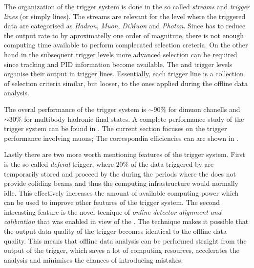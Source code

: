 The organization of the trigger system is done in the so called {\it streams} and {\it trigger lines} (or simply lines).
The streams are relevant for the \lzero level where the triggered data are categorised as {\it Hadron}, {\it Muon},
{\it DiMuon} and {\it Photon}. Since \lzero has to reduce the output rate to \hltone by aproximatelly one order of
magnitute, there is not enough computing time available to perform complecated selection creteria. On the other
hand in the subsequent trigger levels more advanced selection can be required since tracking and PID information
become available. The \hltone and \hlttwo trigger levels organise their output in trigger lines. Essentially,
each trigger line is a collection of selection criteria similar, but looser, to the ones applied during the
offline data analysis.

The overal performance of the \lhcb trigger system is $\sim 90\%$ for dimuon chanells and $\sim 30\%$ for
multibody hadronic final states. A complete performance study of the trigger system can be found in \cite{}.
The current section focuses on the trigger performance involving muons; The correspondin efficiencies can
are shown in \figref{}.

Lastly there are two more worth mentioning features of the \lhcb trigger system. First is the so called
{\it deferal} trigger, where $20\%$ of the data triggered by \lzero are temporarily stored and procced by the \hltone
during the periods where the \lhc does not provide coliding beams and thus the \lhcb computing infrastructure
would normally idle. This effectively increases the amount of available computing power which can be used
to improve other feutures of the trigger system. The second intreasting feature is the novel tecnique of
{\it online detector alignment and calibration} that was enabled in view of the \runtwo. The technique
makes it possible that the output data quality of the trigger becomes identical to the offline data quality.
This means that offline data analysis can be performed straight from the output of the trigger, which saves
a lot of computing resources, accelerates the analysis and minimises the chances of introducing mistakes.
